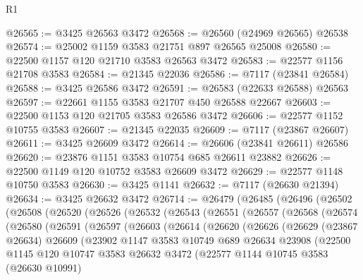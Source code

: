 \begin{lexlean}{R1}
\begin{coremodule}
@26565 := @3425 @26563 @3472
@26568 := @26560 (@24969 @26565) @26538
@26574 := @25002 @1159 @3583 @21751 @897 @26565 @25008
@26580 := @22500 @1157 @120 @21710 @3583 @26563 @3472
@26583 := @22577 @1156 @21708 @3583
@26584 := @21345 @22036
@26586 := @7117 (@23841 @26584)
@26588 := @3425 @26586 @3472
@26591 := @26583 (@22633 @26588) @26563
@26597 := @22661 @1155 @3583 @21707 @450 @26588 @22667
@26603 := @22500 @1153 @120 @21705 @3583 @26586 @3472
@26606 := @22577 @1152 @10755 @3583
@26607 := @21345 @22035
@26609 := @7117 (@23867 @26607)
@26611 := @3425 @26609 @3472
@26614 := @26606 (@23841 @26611) @26586
@26620 := @23876 @1151 @3583 @10754 @685 @26611 @23882
@26626 := @22500 @1149 @120 @10752 @3583 @26609 @3472
@26629 := @22577 @1148 @10750 @3583
@26630 := @3425 @1141
@26632 := @7117 (@26630 @21394)
@26634 := @3425 @26632 @3472
@26714 := @26479
    (@26485
      (@26496
        (@26502
          (@26508
            (@26520
              (@26526
                (@26532
                  (@26543
                    (@26551
                      (@26557
                        (@26568
                          (@26574
                            (@26580
                              (@26591
                                (@26597
                                  (@26603
                                    (@26614
                                      (@26620
                                        (@26626
                                          (@26629
                                            (@23867 @26634)
                                            @26609
                                            (@23902
                                              @1147
                                              @3583
                                              @10749
                                              @689
                                              @26634
                                              @23908
                                              (@22500
                                                @1145
                                                @120
                                                @10747
                                                @3583
                                                @26632
                                                @3472
                                                (@22577
                                                  @1144
                                                  @10745
                                                  @3583
                                                  (@26630 @10991)

\end{coremodule}
\end{lexlean}
